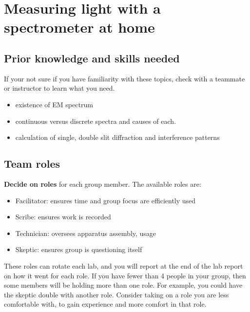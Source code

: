 \chapter{Measuring light with a spectrometer at home}

%

\section{Prior knowledge and skills needed}

If your not sure if you have familiarity with these topics, check with a teammate or instructor to learn what you need.

\begin{itemize}
	\item existence of EM spectrum
	\item continuous versus discrete spectra and causes of each.
	\item calculation of single, double slit diffraction and interference patterns
\end{itemize}

\section{Team roles}

\textbf{Decide on roles} for each group member. The available roles are:

\begin{itemize}
	\item Facilitator: ensures time and group focus are efficiently used
	\item Scribe: ensures work is recorded
	\item Technician: oversees apparatus assembly, usage
	\item Skeptic: ensures group is questioning itself
\end{itemize}

These roles can rotate each lab, and you will report at the end of the lab report on how it went for each role. If you have fewer than 4 people in your group, then some members will be holding more than one role. For example, you could have the skeptic double with another role. Consider taking on a role you are less comfortable with, to gain experience and more comfort in that role.

